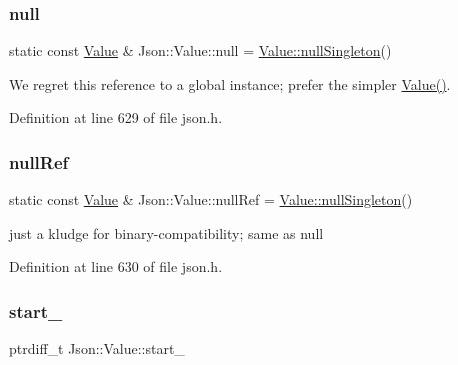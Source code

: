 \subsubsection{\texorpdfstring{null}{null}}
{\footnotesize\ttfamily static const \hyperlink{class_json_1_1_value}{Value} \& Json\+::\+Value\+::null = \hyperlink{class_json_1_1_value_af2f124567acc35d021a424e53ebdfcab}{Value\+::null\+Singleton}()\hspace{0.3cm}{\ttfamily [static]}}



We regret this reference to a global instance; prefer the simpler \hyperlink{class_json_1_1_value_ada6ba1369448fb0240bccc36efaa46f7}{Value()}. 



Definition at line 629 of file json.\+h.

\hypertarget{class_json_1_1_value_a2c2e7ac82f7dd775ed6eee37903d53c6}{}\label{class_json_1_1_value_a2c2e7ac82f7dd775ed6eee37903d53c6} 
\subsubsection{\texorpdfstring{null\+Ref}{nullRef}}
{\footnotesize\ttfamily static const \hyperlink{class_json_1_1_value}{Value} \& Json\+::\+Value\+::null\+Ref = \hyperlink{class_json_1_1_value_af2f124567acc35d021a424e53ebdfcab}{Value\+::null\+Singleton}()\hspace{0.3cm}{\ttfamily [static]}}



just a kludge for binary-\/compatibility; same as null 



Definition at line 630 of file json.\+h.

\hypertarget{class_json_1_1_value_a1c3aeb0fa8fefe93776cb347c76a25a8}{}\label{class_json_1_1_value_a1c3aeb0fa8fefe93776cb347c76a25a8} 
\subsubsection{\texorpdfstring{start\+\_\+}{start\_}}
{\footnotesize\ttfamily ptrdiff\+\_\+t Json\+::\+Value\+::start\+\_\+\hspace{0.3cm}{\ttfamily [private]}}



